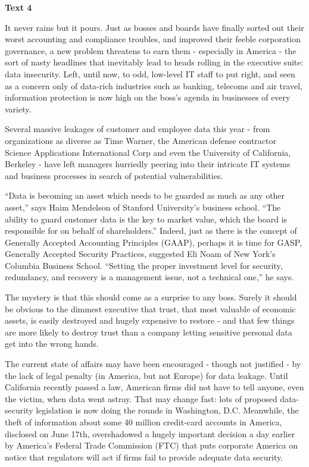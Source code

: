 
\begin{center}\textbf{Text 4}\end{center}

\qquad It never rains but it pours. Just as bosses and boards have finally sorted out their worst accounting and compliance troubles, and improved their feeble corporation governance, a new problem threatens to earn them - especially in America - the sort of nasty headlines that inevitably lead to heads rolling in the executive suite: data insecurity. Left, until now, to odd, low-level IT staff to put right, and seen as a concern only of data-rich industries such as banking, telecoms and air travel, information protection is now high on the boss's agenda in businesses of every variety.

\qquad Several massive leakages of customer and employee data this year - from organizations as diverse as Time Warner, the American defense contractor Science Applications International Corp and even the University of California, Berkeley - have left managers hurriedly peering into their intricate IT systems and business processes in search of potential vulnerabilities.

\qquad ``Data is becoming an asset which needs to be guarded as much as any other asset,'' says Haim Mendelson of Stanford University's business school. ``The ability to guard customer data is the key to market value, which the board is responsible for on behalf of shareholders.'' Indeed, just as there is the concept of Generally Accepted Accounting Principles (GAAP), perhaps it is time for GASP, Generally Accepted Security Practices, suggested Eli Noam of New York's Columbia Business School. ``Setting the proper investment level for security, redundancy, and recovery is a management issue, not a technical one,'' he says.

\qquad The mystery is that this should come as a surprise to any boss. Surely it should be obvious to the dimmest executive that trust, that most valuable of economic assets, is easily destroyed and hugely expensive to restore - and that few things are more likely to destroy trust than a company letting sensitive personal data get into the wrong hands.

\qquad The current state of affairs may have been encouraged - though not justified - by the lack of legal penalty (in America, but not Europe) for data leakage. Until California recently passed a law, American firms did not have to tell anyone, even the victim, when data went astray. That may change fast: lots of proposed data-security legislation is now doing the rounds in Washington, D.C. Meanwhile, the theft of information about some 40 million credit-card accounts in America, disclosed on June 17th, overshadowed a hugely important decision a day earlier by America's Federal Trade Commission (FTC) that puts corporate America on notice that regulators will act if firms fail to provide adequate data security.

